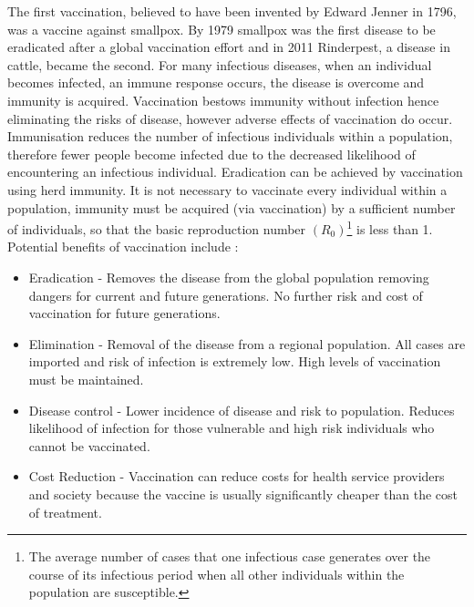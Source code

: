 \documentclass[a4paper,11pt] {scrartcl}
\begin{document}
The first vaccination, believed to have been invented by Edward Jenner in 1796, was a vaccine against smallpox\cite{stewart2006history}. By 1979 smallpox was the first disease to be eradicated after a global vaccination effort\cite{whosmallpoxfactsheet} and in 2011 Rinderpest, a disease in cattle, became the second\cite{faorinderpesteradication}. For many infectious diseases, when an individual becomes infected, an immune response occurs, the disease is overcome and immunity is acquired. Vaccination bestows immunity without infection hence eliminating the risks of disease, however adverse effects of vaccination do occur. Immunisation reduces the number of infectious individuals within a population, therefore fewer people become infected due to the decreased likelihood of encountering an infectious individual. Eradication can be achieved by vaccination using herd immunity. It is not necessary to vaccinate every individual within a population, immunity must be acquired (via vaccination) by a sufficient number of individuals, so that the basic reproduction number $(R_0)$\footnote{The average number of cases that one infectious case generates over the course of its infectious period when all other individuals within the population are susceptible.} is less than 1. Potential benefits of vaccination include :
\begin{itemize}
\item Eradication - Removes the disease from the global population removing dangers for current and future generations. No further risk and cost of vaccination for future generations.
\item Elimination - Removal of the disease from a regional population. All cases are imported and risk of infection is extremely low. High levels of vaccination must be maintained.
\item Disease control - Lower incidence of disease and risk to population. Reduces likelihood of infection for those vulnerable and high risk individuals who cannot be vaccinated.
\item Cost Reduction - Vaccination can reduce costs for health service providers and society because the vaccine is usually significantly cheaper than the cost of treatment\cite{hinman2004economic,peltola1994elimination}.
\end{itemize}
\end{document}
